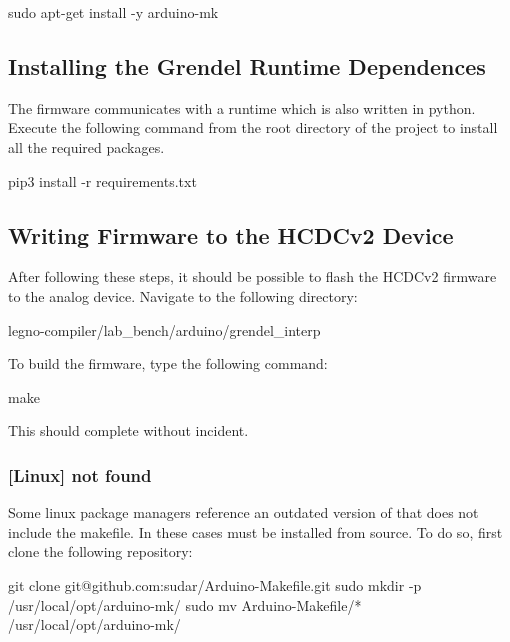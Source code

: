\begin{snippet}
sudo apt-get install -y arduino-mk
\end{snippet}

\subsection{Installing the Grendel Runtime Dependences}


The firmware communicates with a runtime which is also written in python.
Execute the following command from the root directory of the 
project to install all the required packages.

\begin{snippet}
  pip3 install -r requirements.txt
\end{snippet}

\subsection{Writing Firmware to the HCDCv2 Device}
After following these steps, it should be possible to flash the HCDCv2
firmware to the analog device. Navigate to the following directory:

\begin{snippet}
  legno-compiler/lab_bench/arduino/grendel_interp
\end{snippet}

To build the firmware, type the following command:
\begin{snippet}
  make
\end{snippet}

This should complete without incident. 

\subsubsection{[Linux]  not found}

Some linux package managers reference an outdated version of 
that does not include the  makefile. In these cases 
must be installed from source. To do so, first clone the following repository:

\begin{snippet}
git clone git@github.com:sudar/Arduino-Makefile.git
sudo mkdir -p /usr/local/opt/arduino-mk/
sudo mv Arduino-Makefile/* /usr/local/opt/arduino-mk/
\end{snippet}

